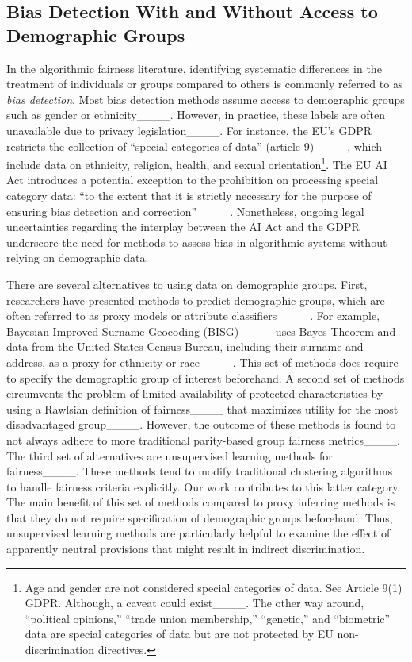 \subsection{Bias Detection With and Without Access to Demographic Groups}
In the algorithmic fairness literature, identifying systematic differences in the treatment of individuals or groups compared to others is commonly referred to as \emph{bias detection}. Most bias detection methods assume access to demographic groups such as gender or ethnicity____. However, in practice, these labels are often unavailable due to privacy legislation____. For instance, the EU's GDPR restricts the collection of ``special categories of data'' (article 9)____, which include data on ethnicity, religion, health, and sexual orientation\footnote{Age and gender are not considered special categories of data. See Article 9(1) GDPR. Although, a caveat could exist____. The other way around, ``political opinions,'' ``trade union membership,'' ``genetic,'' and ``biometric'' data are special categories of data but are not protected by EU non-discrimination directives.}. The EU AI Act introduces a potential exception to the prohibition on processing special category data: ``to the extent that it is strictly necessary for the purpose of ensuring bias detection and correction''____. Nonetheless, ongoing legal uncertainties regarding the interplay between the AI Act and the GDPR underscore the need for methods to assess bias in algorithmic systems without relying on demographic data.

There are several alternatives to using data on demographic groups. First, researchers have presented methods to predict demographic groups, which are often referred to as proxy models or attribute classifiers____. For example, Bayesian Improved Surname Geocoding (BISG)____ uses Bayes Theorem and data from the United States Census Bureau, including their surname and address, as a proxy for ethnicity or race____. This set of methods does require to specify the demographic group of interest beforehand. A second set of methods circumvents the problem of limited availability of protected characteristics by using a Rawlsian definition of fairness____ that maximizes utility for the most disadvantaged group____. However, the outcome of these methods is found to not always adhere to more traditional parity-based group fairness metrics____. The third set of alternatives are unsupervised learning methods for fairness____. These methods tend to modify traditional clustering algorithms to handle fairness criteria explicitly. Our work contributes to this latter category. The main benefit of this set of methods compared to proxy inferring methods is that they do not require specification of demographic groups beforehand. Thus, unsupervised learning methods are particularly helpful to examine the effect of apparently neutral provisions that might result in indirect discrimination. 


